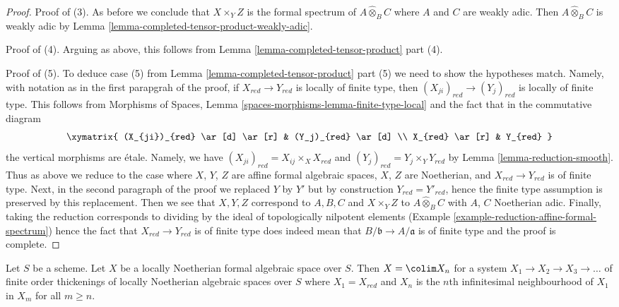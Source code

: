 \begin{proof}
\medskip\noindent
Proof of (3). As before we conclude that $X \times_Y Z$ is the formal spectrum
of $A \widehat{\otimes}_B C$ where $A$ and $C$ are weakly adic.
Then $A \widehat{\otimes}_B C$ is weakly adic by 
Lemma \ref{lemma-completed-tensor-product-weakly-adic}.

\medskip\noindent
Proof of (4). Arguing as above, this follows from
Lemma \ref{lemma-completed-tensor-product} part (4).

\medskip\noindent
Proof of (5). To deduce case (5) from
Lemma \ref{lemma-completed-tensor-product} part (5)
we need to show the hypotheses match.
Namely, with notation as in the first parapgrah of the proof,
if $X_{red} \to Y_{red}$ is locally of finite type, then
$(X_{ji})_{red} \to (Y_j)_{red}$ is locally of finite type. This follows
from Morphisms of Spaces, Lemma \ref{spaces-morphisms-lemma-finite-type-local}
and the fact that in the commutative diagram
$$
\xymatrix{
(X_{ji})_{red} \ar[d] \ar[r] & (Y_j)_{red} \ar[d] \\
X_{red} \ar[r] & Y_{red}
}
$$
the vertical morphisms are \'etale. Namely, we have
$(X_{ji})_{red} = X_{ij} \times_X X_{red}$ and
$(Y_j)_{red} = Y_j \times_Y Y_{red}$
by Lemma \ref{lemma-reduction-smooth}. Thus as above we reduce
to the case where $X$, $Y$, $Z$ are affine formal algebraic spaces,
$X$, $Z$ are Noetherian, and $X_{red} \to Y_{red}$ is of finite type.
Next, in the second paragraph of the proof we replaced $Y$ by $Y'$
but by construction $Y_{red} = Y'_{red}$, hence the finite type
assumption is preserved by this replacement. Then we see that
$X, Y, Z$ correspond to $A, B, C$ and $X \times_Y Z$ to
$A \widehat{\otimes}_B C$ with $A$, $C$ Noetherian adic.
Finally, taking the reduction corresponds to dividing by the
ideal of topologically nilpotent elements
(Example \ref{example-reduction-affine-formal-spectrum})
hence the fact that $X_{red} \to Y_{red}$ is of finite type
does indeed mean that $B/\mathfrak b \to A/\mathfrak a$ is of finite type
and the proof is complete.
\end{proof}

\begin{lemma}
\label{lemma-structure-locally-noetherian}
Let $S$ be a scheme. Let $X$ be a locally Noetherian formal algebraic space
over $S$. Then $X = \colim X_n$ for a system $X_1 \to X_2 \to X_3 \to \ldots$
of finite order thickenings of locally Noetherian algebraic spaces over $S$
where $X_1 = X_{red}$ and $X_n$ is the $n$th infinitesimal neighbourhood of
$X_1$ in $X_m$ for all $m \geq n$.
\end{lemma}

